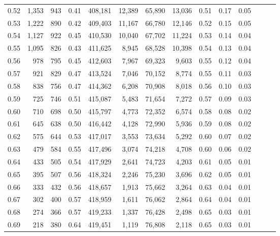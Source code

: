 \begin{tabular}{rrrrrrrrrrrrrr}
0.52 &   1,353 &    943 &  0.41 &  408,181 &   12,389 &  65,890 &  13,036 &  0.51 &  0.17 &      0.05 \\
0.53 &   1,222 &    890 &  0.42 &  409,403 &   11,167 &  66,780 &  12,146 &  0.52 &  0.15 &      0.05 \\
0.54 &   1,127 &    922 &  0.45 &  410,530 &   10,040 &  67,702 &  11,224 &  0.53 &  0.14 &      0.04 \\
0.55 &   1,095 &    826 &  0.43 &  411,625 &    8,945 &  68,528 &  10,398 &  0.54 &  0.13 &      0.04 \\
0.56 &     978 &    795 &  0.45 &  412,603 &    7,967 &  69,323 &   9,603 &  0.55 &  0.12 &      0.04 \\
0.57 &     921 &    829 &  0.47 &  413,524 &    7,046 &  70,152 &   8,774 &  0.55 &  0.11 &      0.03 \\
0.58 &     838 &    756 &  0.47 &  414,362 &    6,208 &  70,908 &   8,018 &  0.56 &  0.10 &      0.03 \\
0.59 &     725 &    746 &  0.51 &  415,087 &    5,483 &  71,654 &   7,272 &  0.57 &  0.09 &      0.03 \\
0.60 &     710 &    698 &  0.50 &  415,797 &    4,773 &  72,352 &   6,574 &  0.58 &  0.08 &      0.02 \\
0.61 &     645 &    638 &  0.50 &  416,442 &    4,128 &  72,990 &   5,936 &  0.59 &  0.08 &      0.02 \\
0.62 &     575 &    644 &  0.53 &  417,017 &    3,553 &  73,634 &   5,292 &  0.60 &  0.07 &      0.02 \\
0.63 &     479 &    584 &  0.55 &  417,496 &    3,074 &  74,218 &   4,708 &  0.60 &  0.06 &      0.02 \\
0.64 &     433 &    505 &  0.54 &  417,929 &    2,641 &  74,723 &   4,203 &  0.61 &  0.05 &      0.01 \\
0.65 &     395 &    507 &  0.56 &  418,324 &    2,246 &  75,230 &   3,696 &  0.62 &  0.05 &      0.01 \\
0.66 &     333 &    432 &  0.56 &  418,657 &    1,913 &  75,662 &   3,264 &  0.63 &  0.04 &      0.01 \\
0.67 &     302 &    400 &  0.57 &  418,959 &    1,611 &  76,062 &   2,864 &  0.64 &  0.04 &      0.01 \\
0.68 &     274 &    366 &  0.57 &  419,233 &    1,337 &  76,428 &   2,498 &  0.65 &  0.03 &      0.01 \\
0.69 &     218 &    380 &  0.64 &  419,451 &    1,119 &  76,808 &   2,118 &  0.65 &  0.03 &      0.01 \\

\end{tabular}
